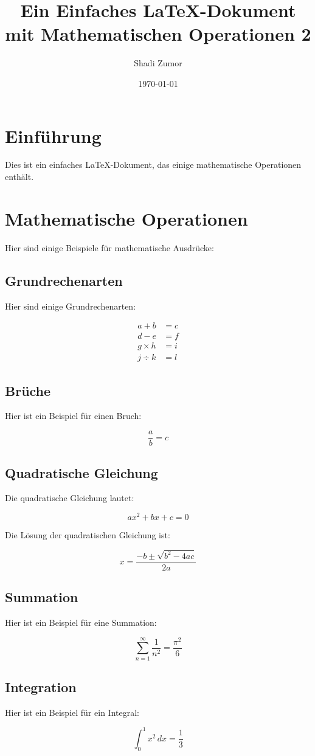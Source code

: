 \documentclass{article}
\begin{document}
\title{Ein Einfaches LaTeX-Dokument mit Mathematischen Operationen 2}
\author{Shadi Zumor}
\date{\today}
\maketitle

\section{Einführung}
Dies ist ein einfaches LaTeX-Dokument, das einige mathematische Operationen enthält.

\section{Mathematische Operationen}

Hier sind einige Beispiele für mathematische Ausdrücke:

\subsection{Grundrechenarten}
Hier sind einige Grundrechenarten:

\begin{align*}
a + b &= c \\
d - e &= f \\
g \times h &= i \\
j \div k &= l
\end{align*}

\subsection{Brüche}
Hier ist ein Beispiel für einen Bruch:

\begin{equation}
\frac{a}{b} = c
\end{equation}

\subsection{Quadratische Gleichung}
Die quadratische Gleichung lautet:

\begin{equation}
ax^2 + bx + c = 0
\end{equation}

Die Lösung der quadratischen Gleichung ist:

\begin{equation}
x = \frac{-b \pm \sqrt{b^2 - 4ac}}{2a}
\end{equation}

\subsection{Summation}
Hier ist ein Beispiel für eine Summation:

\begin{equation}
\sum_{n=1}^{\infty} \frac{1}{n^2} = \frac{\pi^2}{6}
\end{equation}

\subsection{Integration}
Hier ist ein Beispiel für ein Integral:

\begin{equation}
\int_{0}^{1} x^2 \, dx = \frac{1}{3}
\end{equation}
\end{document}
